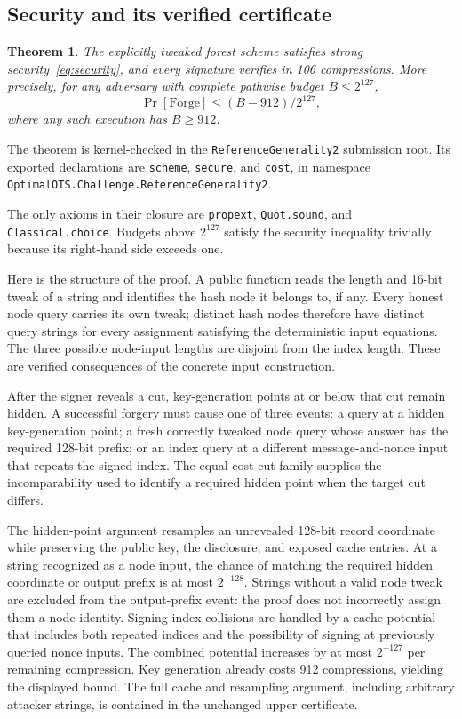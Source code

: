 \documentclass[10pt]{article}
\newtheorem{theorem}{Theorem}
\begin{document}
\subsection{Security and its verified certificate}\label{sec:formal}

\begin{theorem}\label{thm:scheme}
The explicitly tweaked forest scheme satisfies strong security~\eqref{eq:security}, and every signature verifies in 106 compressions. More precisely, for any adversary with complete pathwise budget $B\le2^{127}$,
\[
\Pr[\mathrm{Forge}]\le(B-912)/2^{127},
\]
where any such execution has $B\ge912$.
\end{theorem}

The theorem is kernel-checked in the \texttt{ReferenceGenerality2} submission root. Its exported declarations are \texttt{scheme}, \texttt{secure}, and \texttt{cost}, in namespace \texttt{OptimalOTS.}\allowbreak\texttt{Challenge.ReferenceGenerality2}.

The only axioms in their closure are \texttt{propext}, \texttt{Quot.sound}, and \texttt{Classical.choice}. Budgets above $2^{127}$ satisfy the security inequality trivially because its right-hand side exceeds one.

Here is the structure of the proof. A public function reads the length and 16-bit tweak of a string and identifies the hash node it belongs to, if any. Every honest node query carries its own tweak; distinct hash nodes therefore have distinct query strings for every assignment satisfying the deterministic input equations. The three possible node-input lengths are disjoint from the index length. These are verified consequences of the concrete input construction.

After the signer reveals a cut, key-generation points at or below that cut remain hidden. A successful forgery must cause one of three events: a query at a hidden key-generation point; a fresh correctly tweaked node query whose answer has the required 128-bit prefix; or an index query at a different message-and-nonce input that repeats the signed index. The equal-cost cut family supplies the incomparability used to identify a required hidden point when the target cut differs.

The hidden-point argument resamples an unrevealed 128-bit record coordinate while preserving the public key, the disclosure, and exposed cache entries. At a string recognized as a node input, the chance of matching the required hidden coordinate or output prefix is at most $2^{-128}$. Strings without a valid node tweak are excluded from the output-prefix event: the proof does not incorrectly assign them a node identity. Signing-index collisions are handled by a cache potential that includes both repeated indices and the possibility of signing at previously queried nonce inputs. The combined potential increases by at most $2^{-127}$ per remaining compression. Key generation already costs 912 compressions, yielding the displayed bound. The full cache and resampling argument, including arbitrary attacker strings, is contained in the unchanged upper certificate.
\end{document}
